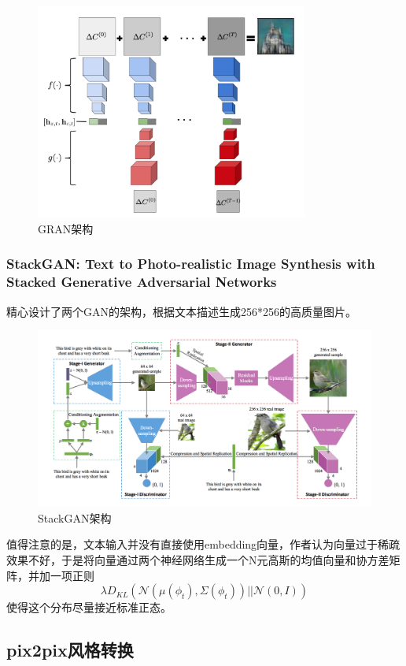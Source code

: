 \documentclass[a4paper]{article}
\begin{document}
\begin{figure}
\centering
\includegraphics[width=0.8\textwidth]{./img/38.png}
\caption{GRAN架构}
\label{fig:38}
\end{figure}

\subsubsection{StackGAN: Text to Photo-realistic Image Synthesis with Stacked Generative Adversarial Networks\cite{DBLP:journals/corr/ZhangXLZHWM16}}
精心设计了两个GAN的架构，根据文本描述生成256*256的高质量图片。
\begin{figure}
\centering
\includegraphics[width=\textwidth]{./img/16.png}
\caption{StackGAN架构}
\label{fig:16}
\end{figure}
值得注意的是，文本输入并没有直接使用embedding向量，作者认为向量过于稀疏效果不好，于是将向量通过两个神经网络生成一个N元高斯的均值向量和协方差矩阵，并加一项正则$$\lambda D_{KL}(\mathcal{N}(\mu(\phi_t),\Sigma(\phi_t))|| \mathcal{N} (0,I))$$使得这个分布尽量接近标准正态。
\subsection{pix2pix风格转换}
\end{document}

